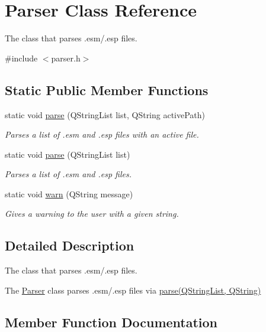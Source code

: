 \hypertarget{class_parser}{}\section{Parser Class Reference}
\label{class_parser}


The class that parses .esm/.esp files.  




{\ttfamily \#include $<$parser.\+h$>$}

\subsection*{Static Public Member Functions}
\begin{DoxyCompactItemize}
\item 
static void \hyperlink{class_parser_a10507a1aecb4a2c548b64060757686ba}{parse} (Q\+String\+List list, Q\+String active\+Path)
\begin{DoxyCompactList}\small\item\em Parses a list of .esm and .esp files with an active file. \end{DoxyCompactList}\item 
static void \hyperlink{class_parser_abf10b1eb4aaf0193156a85aa25021260}{parse} (Q\+String\+List list)
\begin{DoxyCompactList}\small\item\em Parses a list of .esm and .esp files. \end{DoxyCompactList}\item 
static void \hyperlink{class_parser_a0db251c57832be6f327d9749bed7a0f7}{warn} (Q\+String message)
\begin{DoxyCompactList}\small\item\em Gives a warning to the user with a given string. \end{DoxyCompactList}\end{DoxyCompactItemize}


\subsection{Detailed Description}
The class that parses .esm/.esp files. 

The \hyperlink{class_parser}{Parser} class parses .esm/.esp files via \hyperlink{class_parser_a10507a1aecb4a2c548b64060757686ba}{parse(\+Q\+String\+List, Q\+String)} 

\subsection{Member Function Documentation}
\mbox{\label{class_parser_a10507a1aecb4a2c548b64060757686ba}} 

